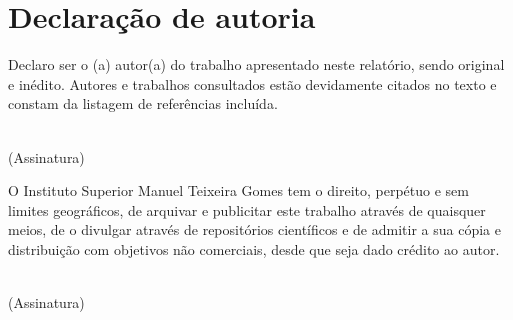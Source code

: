 \chapter*{\TITULO{}  Declaração de autoria}
\label{chapter:copyright}

Declaro ser o (a) autor(a) do trabalho apresentado neste relatório, sendo original e inédito. Autores e trabalhos consultados estão devidamente citados no texto e constam da listagem de referências incluída.
\vspace*{15mm}

\begin{center}
\underline{\hspace{4.5cm}}\\
(Assinatura)
\end{center}
\vspace*{20mm}


O Instituto Superior Manuel Teixeira Gomes tem o direito, perpétuo e sem limites geográficos, de arquivar e publicitar este trabalho através de quaisquer meios, de o divulgar através de repositórios científicos e de admitir a sua cópia e distribuição com objetivos não comerciais, desde que seja dado crédito ao autor.
\vspace*{15mm}
\begin{center}
\underline{\hspace{4.5cm}}\\
(Assinatura)
\end{center}

